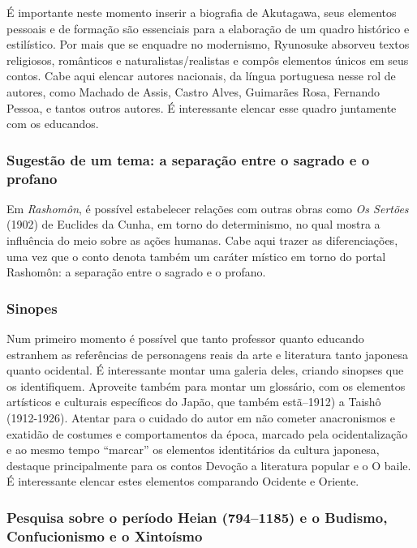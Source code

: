 \documentclass[12pt]{extarticle}
\begin{document}
É importante neste momento inserir a biografia de Akutagawa, seus elementos
pessoais e de formação são essenciais para a elaboração de um quadro histórico
e estilístico. Por mais que se enquadre no modernismo, Ryunosuke absorveu
textos religiosos, românticos e naturalistas/realistas e compôs elementos
únicos em seus contos. Cabe aqui elencar autores nacionais, da língua
portuguesa nesse rol de autores, como Machado de Assis, Castro Alves, Guimarães
Rosa, Fernando Pessoa, e tantos outros autores. É interessante elencar esse
quadro juntamente com os educandos.


\subsubsection{Sugestão de um tema: a separação entre o sagrado e o profano}


Em \textit{Rashomôn}, é possível estabelecer relações com outras obras como \textit{Os Sertões}
(1902) de Euclides da Cunha, em torno do determinismo, no qual mostra a
influência do meio sobre as ações humanas. Cabe aqui trazer as diferenciações,
uma vez que o conto denota também um caráter místico em torno do portal
Rashomôn: a separação entre o sagrado e o profano.

\subsubsection{Sinopes}

Num primeiro momento é possível que tanto professor quanto educando estranhem
as referências de personagens reais da arte e literatura tanto japonesa quanto
ocidental. É interessante montar uma galeria deles, criando sinopses que os
identifiquem. Aproveite também para montar um glossário, com os elementos
artísticos e culturais específicos do Japão, que também estã--1912) a Taishô
(1912-1926). Atentar para o cuidado do autor em não cometer anacronismos e
exatidão de costumes e comportamentos da época, marcado pela ocidentalização e
ao mesmo tempo ``marcar'' os elementos identitários da cultura japonesa,
destaque principalmente para os contos Devoção a literatura popular e o O
baile. É interessante elencar estes elementos comparando Ocidente e Oriente.

\subsubsection{Pesquisa sobre o período Heian (794--1185) e o Budismo, Confucionismo e o
Xintoísmo}
\end{document}
